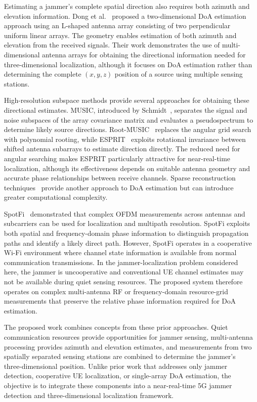 \documentclass[conference]{IEEEtran}
\begin{document}
Estimating a jammer's complete spatial direction also requires both azimuth and
elevation information. Dong et al.~\cite{article2} proposed a two-dimensional
DoA estimation approach using an L-shaped antenna array consisting of two
perpendicular uniform linear arrays. The geometry enables estimation of both
azimuth and elevation from the received signals. Their work demonstrates the
use of multi-dimensional antenna arrays for obtaining the directional
information needed for three-dimensional localization, although it focuses on
DoA estimation rather than determining the complete $(x,y,z)$ position of a
source using multiple sensing stations.

High-resolution subspace methods provide several approaches for obtaining these
directional estimates. MUSIC, introduced by Schmidt~\cite{1143830}, separates
the signal and noise subspaces of the array covariance matrix and evaluates a
pseudospectrum to determine likely source directions. Root-MUSIC~\cite{45540}
replaces the angular grid search with polynomial rooting, while
ESPRIT~\cite{32276} exploits rotational invariance between shifted antenna
subarrays to estimate direction directly. The reduced need for angular
searching makes ESPRIT particularly attractive for near-real-time localization,
although its effectiveness depends on suitable antenna geometry and accurate
phase relationships between receive channels. Sparse reconstruction
techniques~\cite{inbook} provide another approach to DoA estimation but can
introduce greater computational complexity.

SpotFi~\cite{article} demonstrated that complex OFDM measurements across
antennas and subcarriers can be used for localization and multipath resolution.
SpotFi exploits both spatial and frequency-domain phase information to
distinguish propagation paths and identify a likely direct path. However,
SpotFi operates in a cooperative Wi-Fi environment where channel state
information is available from normal communication transmissions. In the
jammer-localization problem considered here, the jammer is uncooperative and
conventional UE channel estimates may not be available during quiet sensing
resources. The proposed system therefore operates on complex multi-antenna RF or
frequency-domain resource-grid measurements that preserve the relative phase
information required for DoA estimation.

The proposed work combines concepts from these prior approaches. Quiet
communication resources provide opportunities for jammer sensing, multi-antenna
processing provides azimuth and elevation estimates, and measurements from two
spatially separated sensing stations are combined to determine the jammer's
three-dimensional position. Unlike prior work that addresses only jammer
detection, cooperative UE localization, or single-array DoA estimation, the
objective is to integrate these components into a near-real-time 5G jammer
detection and three-dimensional localization framework.
\end{document}
